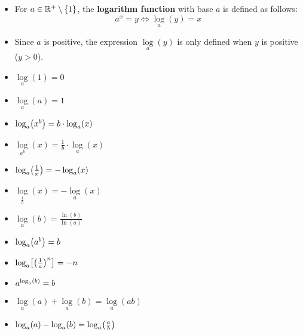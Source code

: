 \documentclass[12pt,a4paper,titlepage]{article}
\DeclarePairedDelimiter {\pars}  {  (      }     {  )      }
\DeclarePairedDelimiter {\bracs} {  [      }     {  ]      }
\DeclarePairedDelimiter {\curls} { \{      }     { \}      }
\begin{document}
            \begin{SummaryBox}[title=Logarithms]
                \begin{itemize}[leftmargin=*]
                    \item For $a \in \mathbb{R}^+ \setminus \curls{1}$, the \textbf{logarithm function} with base $a$ is defined as follows:
                    \[
                        a^x = y \iff \log\limits_a (y) = x
                    \]
                    \item Since $a$ is positive, the expression $\log\limits_a (y)$ is only defined when $y$ is positive ($y>0$).
                \end{itemize}
                
                \begin{SummaryExtensionBox}[title=Log laws]
                    \begin{multicols}{2}
                        \begin{itemize}[leftmargin=*, itemsep=5pt]
                            \item $\log\limits_a (1) = 0$
                            \item $\log\limits_a (a) = 1$
                            \item $\log\limits_a \pars*{x^b} = b \cdot \log\limits_a (x)$
                            \item $\log\limits_{a^b} (x) = \frac{1}{b} \cdot \log\limits_a (x)$
                            \item $\log\limits_a \pars*{\frac{1}{x}} = -\log\limits_a (x)$
                            \item $\log\limits_{\frac{1}{a}} (x) = -\log\limits_a (x)$
                            \item $\log\limits_a (b) = \frac{\ln(b)}{\ln(a)}$
                            \item $\log\limits_a \pars*{a^b} = b$
                            \item $\log\limits_a \bracs*{\pars*{\frac{1}{a}}^n} = -n$
                            \item $a^{\log\limits_a \pars*{b}} = b$
                            \item $\log\limits_a (a) + \log\limits_a (b) = \log\limits_a (ab)$
                            \item $\log\limits_a (a) - \log\limits_a (b) = \log\limits_a \pars*{\frac{a}{b}}$
                        \end{itemize}
                    \end{multicols}
                \end{SummaryExtensionBox}
                

\end{SummaryBox}
\end{document}
